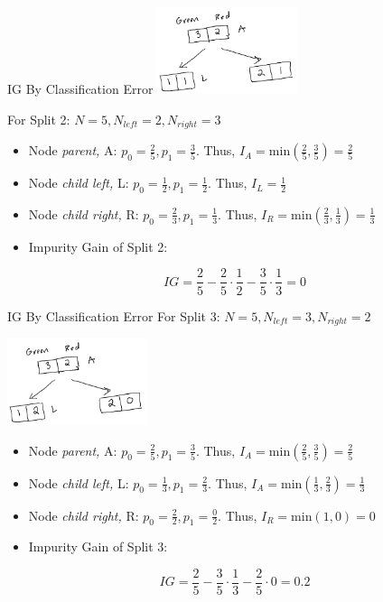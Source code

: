 \documentclass[
  ignorenonframetext,
]{beamer}
\begin{document}
\begin{frame}{IG By Classification Error}
\label{ig-by-classification-error-1}
\includegraphics[width=\textwidth,height=1in]{images/im3.png}

For Split 2: \(N = 5, N_{left} =2, N_{right} = 3\)

\begin{itemize}
\item
  Node \emph{parent,} A: \(p_0 = \frac{2}{5}, p_1 = \frac{3}{5}\). Thus,
  \(I_{A} = \text{min}(\frac{2}{5}, \frac{3}{5}) = \frac{2}{5}\)
\item
  Node \emph{child left,} L: \(p_0 = \frac{1}{2}, p_1 = \frac{1}{2}\).
  Thus, \(I_{L} = \frac{1}{2}\)
\item
  Node \emph{child right,} R: \(p_0 = \frac{2}{3}, p_1 = \frac{1}{3}\).
  Thus, \(I_{R} = \text{min}(\frac{2}{3}, \frac{1}{3}) = \frac{1}{3}\)
\item
  Impurity Gain of Split 2:
\end{itemize}

\[IG = \frac{2}{5} - \frac{2}{5} \cdot \frac{1}{2}-\frac{3}{5} \cdot \frac{1}{3} = 0\]
\end{frame}

\begin{frame}{IG By Classification Error}
\label{ig-by-classification-error-2}
For Split 3: \(N = 5, N_{left} =3, N_{right} = 2\)

\includegraphics[width=\textwidth,height=1in]{images/im2.png}

\begin{itemize}
\item
  Node \emph{parent,} A: \(p_0 = \frac{2}{5}, p_1 = \frac{3}{5}\). Thus,
  \(I_{A} = \text{min}(\frac{2}{5}, \frac{3}{5}) = \frac{2}{5}\)
\item
  Node \emph{child left,} L: \(p_0 = \frac{1}{3}, p_1 = \frac{2}{3}\).
  Thus, \(I_{A} = \text{min}(\frac{1}{3}, \frac{2}{3}) = \frac{1}{3}\)
\item
  Node \emph{child right,} R: \(p_0 = \frac{2}{2}, p_1 = \frac{0}{2}\).
  Thus, \(I_{R} = \text{min}(1,0) = 0\)
\item
  Impurity Gain of Split 3:
\end{itemize}

\[IG = \frac{2}{5} - \frac{3}{5} \cdot \frac{1}{3}-\frac{2}{5} \cdot 0 = 0.2\]
\end{frame}
\end{document}
